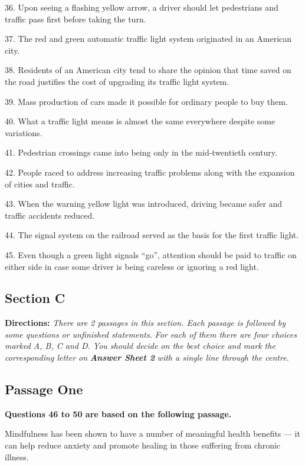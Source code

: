 \documentclass[UTF8,11pt]{ctexart}
\begin{document}
36. Upon seeing a flashing yellow arrow, a driver should let pedestrians and traffic pass first before taking the turn.


37. The red and green automatic traffic light system originated in an American city.


38. Residents of an American city tend to share the opinion that time saved on the road justifies the cost of upgrading its traffic light system.


39. Mass production of cars made it possible for ordinary people to buy them.


40. What a traffic light means is almost the same everywhere despite some variations.


41. Pedestrian crossings came into being only in the mid-twentieth century.


42. People raced to address increasing traffic problems along with the expansion of cities and traffic.


43. When the warning yellow light was introduced, driving became safer and traffic accidents reduced.


44. The signal system on the railroad served as the basis for the first traffic light.


45. Even though a green light signals “go”, attention should be paid to traffic on either side in case some driver is being careless or ignoring a red light.


\subsection*{\textbf{Section C}}


\textbf{Directions: }\textit{There are 2 passages in this section. Each passage is followed by some questions or unfinished statements.} \textit{For each of them there are four choices marked A, B, C and D. You should decide on the best choice and mark the} \textit{corresponding letter on }\textbf{\textit{Answer Sheet 2}}\textit{ with a single line through the centre.}


\subsection*{\textbf{Passage One}}


\textbf{Questions 46 to 50 are based on the following passage.}


Mindfulness has been shown to have a number of meaningful health benefits — it can help reduce anxiety and promote healing in those suffering from chronic illness.
\end{document}
